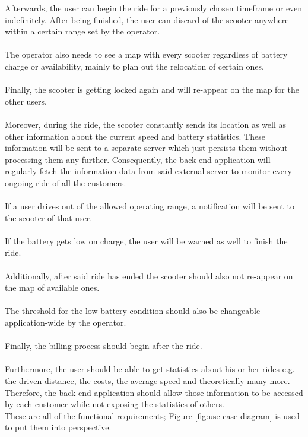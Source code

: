 \documentclass[12pt,a4paper,twoside]{report}
\begin{document}
Afterwards, the user can begin the ride for a previously chosen timeframe
or even indefinitely. After being finished, the user can discard of the scooter
anywhere within a certain range set by the operator.\\\\
The operator also needs to see a map with every scooter regardless of battery
charge or availability, mainly to plan out the relocation of certain ones.\\\\
Finally, the scooter is getting locked again and will re-appear on the map for the other users.\\\\
Moreover, during the ride, the scooter constantly sends its location as well
as other information about the current speed and battery statistics.
These information will be sent to a separate server which just persists them
without processing them any further.
Consequently, the back-end application will regularly fetch the information data
from said external server to monitor every ongoing ride of all the customers.\\\\
If a user drives out of the allowed operating range, a notification will be sent
to the scooter of that user.\\\\
If the battery gets low on charge, the user will be warned as well to finish the ride.\\\\
Additionally, after said ride has ended the scooter should also not re-appear
on the map of available ones.\\\\
The threshold for the low battery condition should also be changeable
application-wide by the operator.\\\\
Finally, the billing process should begin after the ride.\\\\
Furthermore, the user should be able to get statistics about his or her rides
e.g. the driven distance, the costs, the average speed and theoretically
many more. Therefore, the back-end application should allow those information
to be accessed by each customer while not exposing the statistics of others.\\

These are all of the functional requirements;
Figure \ref{fig:use-case-diagram} is used to put them into perspective.\\
\end{document}
